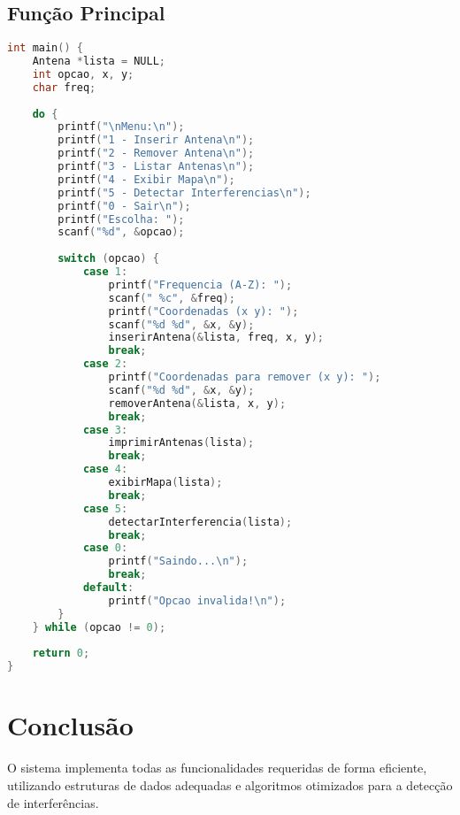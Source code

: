 \documentclass[a4paper, 12pt]{report}
\begin{document}
\section{Função Principal}
\begin{lstlisting}[language=C, caption=Função main]
int main() {
    Antena *lista = NULL;
    int opcao, x, y;
    char freq;
    
    do {
        printf("\nMenu:\n");
        printf("1 - Inserir Antena\n");
        printf("2 - Remover Antena\n");
        printf("3 - Listar Antenas\n");
        printf("4 - Exibir Mapa\n");
        printf("5 - Detectar Interferencias\n");
        printf("0 - Sair\n");
        printf("Escolha: ");
        scanf("%d", &opcao);
        
        switch (opcao) {
            case 1:
                printf("Frequencia (A-Z): ");
                scanf(" %c", &freq);
                printf("Coordenadas (x y): ");
                scanf("%d %d", &x, &y);
                inserirAntena(&lista, freq, x, y);
                break;
            case 2:
                printf("Coordenadas para remover (x y): ");
                scanf("%d %d", &x, &y);
                removerAntena(&lista, x, y);
                break;
            case 3:
                imprimirAntenas(lista);
                break;
            case 4:
                exibirMapa(lista);
                break;
            case 5:
                detectarInterferencia(lista);
                break;
            case 0:
                printf("Saindo...\n");
                break;
            default:
                printf("Opcao invalida!\n");
        }
    } while (opcao != 0);
    
    return 0;
}
\end{lstlisting}

\chapter{Conclusão}
O sistema implementa todas as funcionalidades requeridas de forma eficiente, utilizando estruturas de dados adequadas e algoritmos otimizados para a detecção de interferências.
\end{document}
